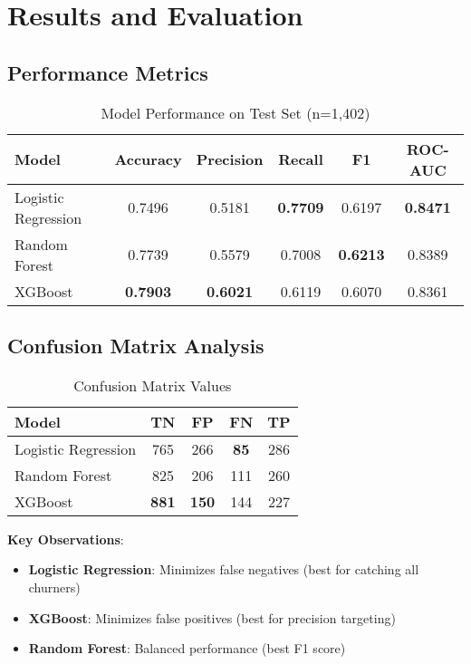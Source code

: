 \documentclass[11pt,a4paper]{article}
\begin{document}
\section{Results and Evaluation}

\subsection{Performance Metrics}

\begin{table}[h]
\centering
\begin{tabular}{@{}lccccc@{}}
\toprule
\textbf{Model} & \textbf{Accuracy} & \textbf{Precision} & \textbf{Recall} & \textbf{F1} & \textbf{ROC-AUC} \\ \midrule
Logistic Regression & 0.7496 & 0.5181 & \textbf{0.7709} & 0.6197 & \textbf{0.8471} \\
Random Forest & 0.7739 & 0.5579 & 0.7008 & \textbf{0.6213} & 0.8389 \\
XGBoost & \textbf{0.7903} & \textbf{0.6021} & 0.6119 & 0.6070 & 0.8361 \\ \bottomrule
\end{tabular}
\caption{Model Performance on Test Set (n=1,402)}
\end{table}

\subsection{Confusion Matrix Analysis}

\begin{table}[h]
\centering
\begin{tabular}{@{}lcccc@{}}
\toprule
\textbf{Model} & \textbf{TN} & \textbf{FP} & \textbf{FN} & \textbf{TP} \\ \midrule
Logistic Regression & 765 & 266 & \textbf{85} & 286 \\
Random Forest & 825 & 206 & 111 & 260 \\
XGBoost & \textbf{881} & \textbf{150} & 144 & 227 \\ \bottomrule
\end{tabular}
\caption{Confusion Matrix Values}
\end{table}

\textbf{Key Observations}:
\begin{itemize}
    \item \textbf{Logistic Regression}: Minimizes false negatives (best for catching all churners)
    \item \textbf{XGBoost}: Minimizes false positives (best for precision targeting)
    \item \textbf{Random Forest}: Balanced performance (best F1 score)
\end{itemize}
\end{document}
